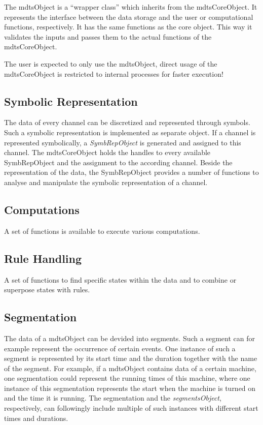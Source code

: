 \documentclass[a4]{scrreprt}
\begin{document}
The mdtsObject is a ``wrapper class'' which inherits from the mdtsCoreObject. It represents the interface between the data storage and the user or computational functions, respectively. It has the same functions as the core object. This way it validates the inputs and passes them to the actual functions of the mdtsCoreObject.

The user is expected to only use the mdtsObject, direct usage of the mdtsCoreObject is restricted to internal processes for faster execution!

\subsection{Symbolic Representation}

The data of every channel can be discretized and represented through symbols. Such a symbolic representation is implemented as separate object. If a channel is represented symbolically, a \textit{SymbRepObject} is generated and assigned to this channel. The mdtsCoreObject holds the handles to every available SymbRepObject and the assignment to the according channel. Beside the representation of the data, the SymbRepObject provides a number of functions to analyse and manipulate the symbolic representation of a channel.

\subsection{Computations}

A set of functions is available to execute various computations.

\subsection{Rule Handling}

A set of functions to find specific states within the data and to combine or superpose states with rules.

\subsection{Segmentation}

The data of a mdtsObject can be devided into segments. Such a segment can for example represent the occurrence of certain events. One instance of such a segment is represented by its start time and the duration together with the name of the segment. For example, if a mdtsObject contains data of a certain machine, one segmentation could represent the running times of this machine, where one instance of this segmentation represents the start when the machine is turned on and the time it is running. The segmentation and the \textit{segmentsObject}, respectively, can followingly include multiple of such instances with different start times and durations.
\end{document}
